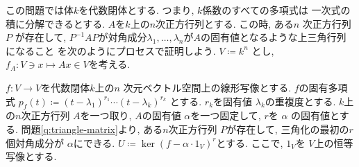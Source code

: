 \documentclass[lualatex]{exam}
\theoremstyle{remark}
\theoremstyle{plain}
\begin{document}
\begin{questions}

  \question 
  \label{q:triangle-matrix} この問題では体$k$を代数閉体とする. つまり, $k$係数のすべての多項式は
  一次式の積に分解できるとする. $A$を$k$上の$n$次正方行列とする. この時, ある$n$ 次正方行列
  $P$ が存在して, 
  $P^{-1}AP$が対角成分$\lambda_1, \ldots ,\lambda_n$が$A$の固有値となるような上三角行列になること
  を次のようにプロセスで証明しよう. 
  $V\coloneqq k^n$ とし, $f_A: V \ni x \mapsto Ax \in V$を考える. 

  \question $f:V\to V$を代数閉体$k$上の$n$ 次元ベクトル空間上の線形写像とする. 
  $f$の固有多項式 $p_f (t) \coloneqq  (t- \lambda_1)^{r_1}\cdots (t- \lambda_k)^{r_k}$ とする. 
  $r_k$を固有値 $\lambda_k$の重複度とする. $k$上の$n$次正方行列 $A$を一つ取り, 
   $A$の固有値 $\alpha $を一つ固定して, $r$を $\alpha $ の固有値とする. 
   問題\ref{q:triangle-matrix}より, ある$n$次正方行列
   $P$が存在して, 三角化の最初の$r$個対角成分が $\alpha $にできる. $U \coloneqq  \ker (f - \alpha \cdot 1_V)^r$とする. 
   ここで, $1_V $を $V$上の恒等写像とする. 
\end{questions}
\end{document}
